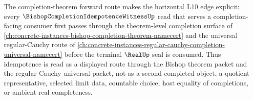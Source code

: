 The completion-theorem forward route makes the horizontal L10 edge explicit: every $\BishopCompletionIdempotenceWitnessUp$ read that serves a completion-facing consumer first passes through the theorem-level completion surface of \autoref{ch:concrete-instances-bishop-completion-theorem-namecert} and the universal regular-Cauchy route of \autoref{ch:concrete-instances-regular-cauchy-completion-universal-namecert} before the terminal $\RealUp$ seal is consumed. Thus idempotence is read as a displayed route through the Bishop theorem packet and the regular-Cauchy universal packet, not as a second completed object, a quotient representative, selected limit data, countable choice, host equality of completions, or ambient real completeness.
